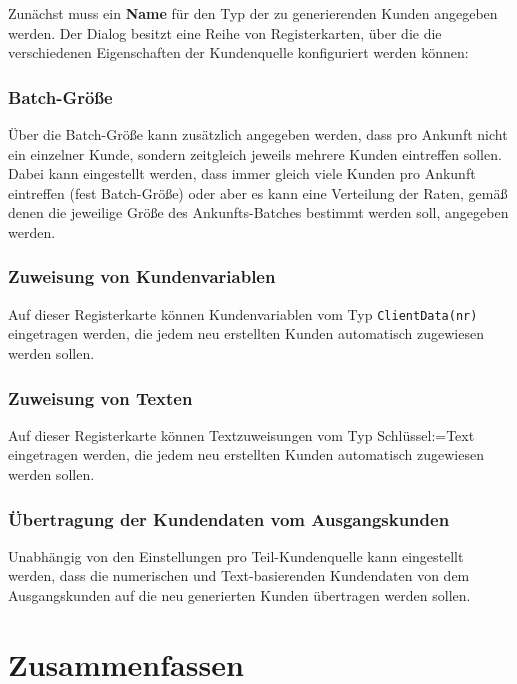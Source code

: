 Zunächst muss ein \textbf{Name} für den Typ der zu generierenden Kunden angegeben werden.
Der Dialog besitzt eine Reihe von Registerkarten, über die die verschiedenen Eigenschaften
der Kundenquelle konfiguriert werden können:

\subsubsection*{Batch-Größe}

Über die Batch-Größe kann zusätzlich
angegeben werden, dass pro Ankunft nicht ein einzelner Kunde, sondern zeitgleich jeweils
mehrere Kunden eintreffen sollen. Dabei kann eingestellt werden, dass immer gleich
viele Kunden pro Ankunft eintreffen (fest Batch-Größe) oder aber es kann eine Verteilung
der Raten, gemäß denen die jeweilige Größe des Ankunfts-Batches bestimmt werden soll,
angegeben werden.

\subsubsection*{Zuweisung von Kundenvariablen}

Auf dieser Registerkarte können Kundenvariablen vom Typ \texttt{ClientData(nr)} eingetragen werden,
die jedem neu erstellten Kunden automatisch zugewiesen werden sollen.

\subsubsection*{Zuweisung von Texten}

Auf dieser Registerkarte können Textzuweisungen vom Typ Schlüssel:=Text eingetragen werden,
die jedem neu erstellten Kunden automatisch zugewiesen werden sollen.

\subsubsection*{Übertragung der Kundendaten vom Ausgangskunden}

Unabhängig von den Einstellungen pro Teil-Kundenquelle kann eingestellt werden,
dass die numerischen und Text-basierenden Kundendaten von dem Ausgangskunden
auf die neu generierten Kunden übertragen werden sollen.


\section{Zusammenfassen}
\label{ref:ModelElementBatch}

